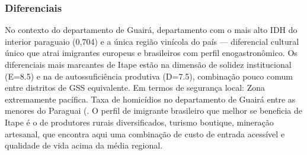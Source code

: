 \subsubsection*{Diferenciais}\label{dif-itape-0408}
No contexto do departamento de Guairá, departamento com o mais alto IDH do interior paraguaio (0,704) e a única região vinícola do país — diferencial cultural único que atrai imigrantes europeus e brasileiros com perfil enogastronômico. Os diferenciais mais marcantes de Itape estão na dimensão de solidez institucional (E=8.5) e na de autossuficiência produtiva (D=7.5), combinação pouco comum entre distritos de GSS equivalente. Em termos de segurança local: Zona extremamente pacífica. Taxa de homicídios no departamento de Guairá entre as menores do Paraguai (. O perfil de imigrante brasileiro que melhor se beneficia de Itape é o de produtores rurais diversificados, turismo boutique, mineração artesanal, que encontra aqui uma combinação de custo de entrada acessível e qualidade de vida acima da média regional.
